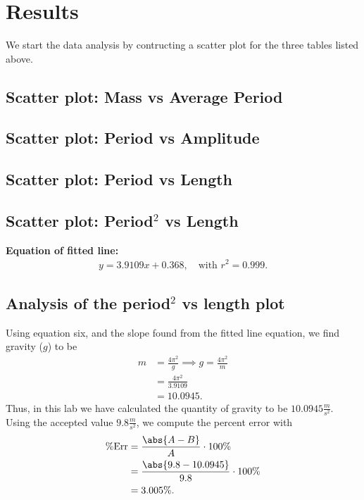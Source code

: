 \documentclass{report}
\begin{document}
    \bigbreak \noindent 
    \section{Results}
    \bigbreak \noindent 
    We start the data analysis by contructing a scatter plot for the three tables listed above.
    \bigbreak \noindent 
    \subsection{Scatter plot: Mass vs Average Period}
    \bigbreak \noindent 

    \bigbreak \noindent 
    \subsection{Scatter plot: Period vs Amplitude}
    \bigbreak \noindent 

    \bigbreak \noindent 
    \subsection{Scatter plot: Period vs Length}
    \bigbreak \noindent 

    \bigbreak \noindent 
    \subsection{Scatter plot: Period$^{2}$ vs Length}
    \bigbreak \noindent 

    \bigbreak \noindent 
    \textbf{Equation of fitted line:}
    \begin{align*}
        y = 3.9109x + 0.368, \quad \text{with } r^{2} = 0.999
    .\end{align*}

    \bigbreak \noindent 
    \subsection{Analysis of the period$^{2}$ vs length plot}
    \bigbreak \noindent 
    Using equation six, and the slope found from the fitted line equation, we find gravity ($g$) to be
    \begin{align*}
        m &= \frac{4\pi^{2}}{g} \implies g = \frac{4\pi^{2}}{m}\\
          &= \frac{4\pi^{2}}{3.9109} \\
          &=10.0945
    .\end{align*}
    Thus, in this lab we have calculated the quantity of gravity to be $10.0945 \frac{m}{s^{2}}$. Using the accepted value $9.8 \frac{m}{s^{2}}$, we compute the percent error with
    \begin{align*}
        \text{\%Err} &= \frac{\abs{A-B}}{A} \cdot 100\% \\
                     &= \frac{\abs{9.8 - 10.0945}}{9.8} \cdot 100\% \\
                     &=3.005\%
    .\end{align*}
\end{document}
